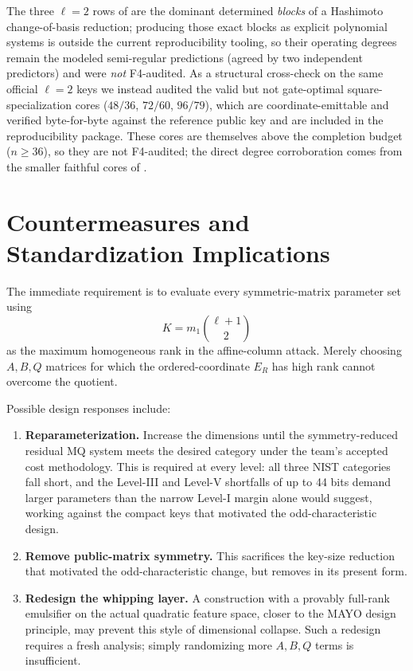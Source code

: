 \documentclass[11pt]{article}
\begin{document}
The three $\ell=2$ rows of  are the dominant determined
\emph{blocks} of a Hashimoto change-of-basis reduction; producing those exact
blocks as explicit polynomial systems is outside the current reproducibility
tooling, so their operating degrees remain the modeled semi-regular predictions
(agreed by two independent predictors) and were \emph{not} F4-audited.  As a
structural cross-check on the same official $\ell=2$ keys we instead audited the
valid but not gate-optimal square-specialization cores ($48/36$, $72/60$,
$96/79$), which are coordinate-emittable and verified byte-for-byte against the
reference public key and are included in the reproducibility package.  These
cores are themselves above the completion budget ($n\ge36$), so they are not
F4-audited; the direct degree corroboration comes from the smaller faithful cores
of .

\section{Countermeasures and Standardization Implications}\label{sec:countermeasures}

The immediate requirement is to evaluate every symmetric-matrix parameter set using
\[
 K=m_1\binom{\ell+1}{2}
\]
as the maximum homogeneous rank in the affine-column attack.  Merely choosing $A,B,Q$ matrices for which the ordered-coordinate $E_R$ has high rank cannot overcome the quotient.

Possible design responses include:
\begin{enumerate}
\item \textbf{Reparameterization.} Increase the dimensions until the symmetry-reduced residual MQ system meets the desired category under the team's accepted cost methodology.  This is required at every level: all three NIST categories fall short, and the Level-III and Level-V shortfalls of up to 44 bits demand larger parameters than the narrow Level-I margin alone would suggest, working against the compact keys that motivated the odd-characteristic design.
\item \textbf{Remove public-matrix symmetry.} This sacrifices the key-size reduction that motivated the odd-characteristic change, but removes  in its present form.
\item \textbf{Redesign the whipping layer.} A construction with a provably full-rank emulsifier on the actual quadratic feature space, closer to the MAYO design principle, may prevent this style of dimensional collapse.  Such a redesign requires a fresh analysis; simply randomizing more $A,B,Q$ terms is insufficient.
\end{enumerate}
\end{document}
